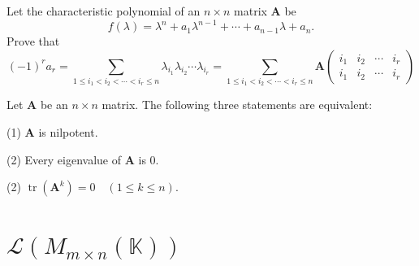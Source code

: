 \documentclass[12pt, a4paper, oneside]{book}
\begin{document}
\begin{theorem}
    Let the characteristic polynomial of an $n \times n$ matrix $\mathbf{A}$ be
    \[
        f(\lambda)=\lambda^n+a_1 \lambda^{n-1}+\cdots+a_{n-1} \lambda+a_n .
    \]
    Prove that
    \[
        (-1)^r a_r
        =
        \sum_{1 \leq i_1<i_2<\cdots<i_r \leq n} \lambda_{i_1} \lambda_{i_2} \cdots \lambda_{i_r}
        =
        \sum_{1 \leq i_1<i_2<\cdots<i_r \leq n} \mathbf{A}
        \left(
        \begin{array}{llll}
                i_1 & i_2 & \cdots & i_r \\
                i_1 & i_2 & \cdots & i_r
            \end{array}
        \right)
    \]
\end{theorem}
\begin{corollary}
    Let $\mathbf{A}$ be an $n \times n$ matrix. The following three statements are equivalent:

    (1) $\mathbf{A}$ is nilpotent.

    (2) Every eigenvalue of $\mathbf{A}$ is $0$.

    (2) $\operatorname{tr}\left(\mathbf{A}^k\right)=0 \quad (1 \leq k \leq n)$.


\end{corollary}







\section{\texorpdfstring{$\mathcal{L}\left(M_{m \times n}\left(\mathbb{K}\right)\right)$}{}}
\end{document}
